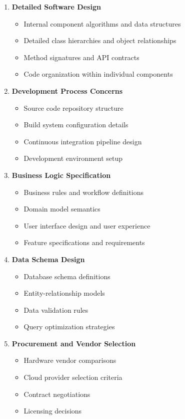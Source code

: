 \documentclass[11pt,letterpaper]{article}
\begin{document}
\begin{enumerate}[label=\textbf{AC\arabic*:}, leftmargin=2.5em]
    \item \textbf{Detailed Software Design}
    \begin{itemize}[nosep]
        \item Internal component algorithms and data structures
        \item Detailed class hierarchies and object relationships
        \item Method signatures and API contracts
        \item Code organization within individual components
    \end{itemize}
    
    \item \textbf{Development Process Concerns}
    \begin{itemize}[nosep]
        \item Source code repository structure
        \item Build system configuration details
        \item Continuous integration pipeline design
        \item Development environment setup
    \end{itemize}
    
    \item \textbf{Business Logic Specification}
    \begin{itemize}[nosep]
        \item Business rules and workflow definitions
        \item Domain model semantics
        \item User interface design and user experience
        \item Feature specifications and requirements
    \end{itemize}
    
    \item \textbf{Data Schema Design}
    \begin{itemize}[nosep]
        \item Database schema definitions
        \item Entity-relationship models
        \item Data validation rules
        \item Query optimization strategies
    \end{itemize}
    
    \item \textbf{Procurement and Vendor Selection}
    \begin{itemize}[nosep]
        \item Hardware vendor comparisons
        \item Cloud provider selection criteria
        \item Contract negotiations
        \item Licensing decisions
    \end{itemize}
\end{enumerate}
\end{document}
